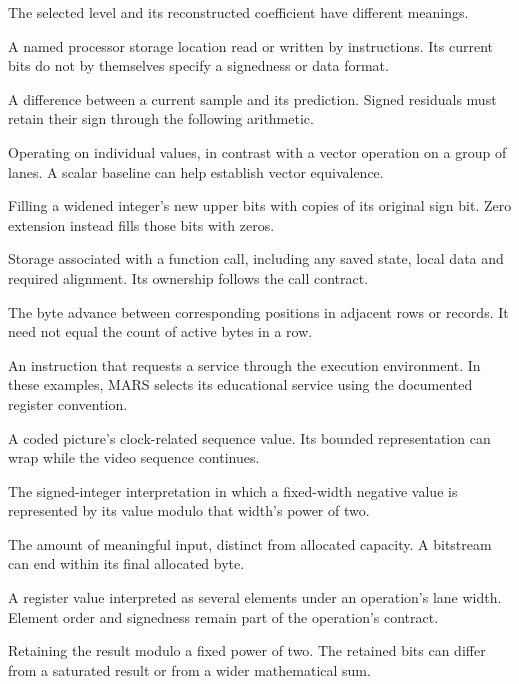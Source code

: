 \begin{description}
        The selected level and its reconstructed coefficient have different meanings.
  \item[Register] A named processor storage location read or written by instructions.
        Its current bits do not by themselves specify a signedness or data format.
  \item[Residual] A difference between a current sample and its prediction. Signed
        residuals must retain their sign through the following arithmetic.
  \item[Scalar] Operating on individual values, in contrast with a vector operation
        on a group of lanes. A scalar baseline can help establish vector equivalence.
  \item[Sign extension] Filling a widened integer's new upper bits with copies of
        its original sign bit. Zero extension instead fills those bits with zeros.
  \item[Stack frame] Storage associated with a function call, including any saved
        state, local data and required alignment. Its ownership follows the call contract.
  \item[Stride] The byte advance between corresponding positions in adjacent rows
        or records. It need not equal the count of active bytes in a row.
  \item[Syscall] An instruction that requests a service through the execution environment. In these examples, MARS selects its educational service using the documented register convention.
  \item[Temporal reference] A coded picture's clock-related sequence value. Its
        bounded representation can wrap while the video sequence continues.
  \item[Two's complement] The signed-integer interpretation in which a fixed-width
        negative value is represented by its value modulo that width's power of two.
  \item[Valid length] The amount of meaningful input, distinct from allocated
        capacity. A bitstream can end within its final allocated byte.
  \item[Vector] A register value interpreted as several elements under an operation's
        lane width. Element order and signedness remain part of the operation's contract.
  \item[Wrapping] Retaining the result modulo a fixed power of two. The retained
        bits can differ from a saturated result or from a wider mathematical sum.
\end{description}
